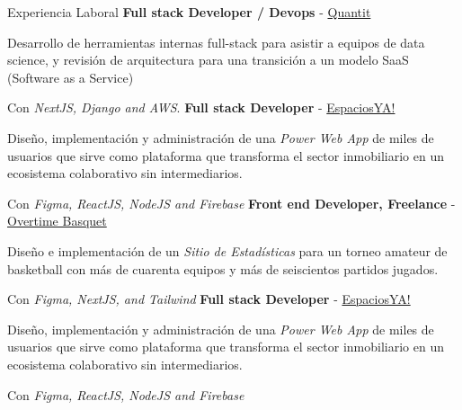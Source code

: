 \begin{rubric}{Experiencia Laboral}
\entry*[2025 -- 2025]%
	\textbf{Full stack Developer / Devops} - {\href{https://bequantit.com/home/}{Quantit}}\par
    Desarrollo de herramientas internas full-stack para asistir a equipos de data science, y revisión de arquitectura para una transición a un modelo SaaS (Software as a Service) \par
    Con \emph{NextJS, Django and AWS}.
\entry*[2023 -- 2024]%
	\textbf{Full stack Developer} - {\href{http://www.espaciosya.com}{EspaciosYA!}}\par
    Diseño, implementación y administración de una \emph{Power Web App} de miles de usuarios que sirve como plataforma que transforma el sector inmobiliario en un ecosistema colaborativo sin intermediarios.\par
    Con \emph{Figma, ReactJS, NodeJS and Firebase}
\entry*[2022 -- 2023]%
	\textbf{Front end Developer, Freelance} - {\href{http://www.overtimebasquet.com}{Overtime Basquet}}\par
    Diseño e implementación de un \emph{Sitio de Estadísticas} para un torneo amateur de basketball con más de cuarenta equipos y más de seiscientos partidos jugados.\par
    Con \emph{Figma, NextJS, and Tailwind}
\entry*[2021 -- 2022]%
	\textbf{Full stack Developer} - {\href{http://www.espaciosya.com}{EspaciosYA!}}\par
	Diseño, implementación y administración de una \emph{Power Web App} de miles de usuarios que sirve como plataforma que transforma el sector inmobiliario en un ecosistema colaborativo sin intermediarios.\par
    Con \emph{Figma, ReactJS, NodeJS and Firebase}
\end{rubric}